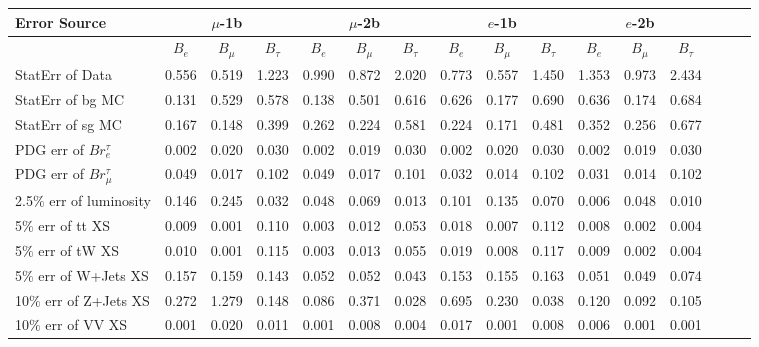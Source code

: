 \begin{sidewaystable}[p]
  \small
  \renewcommand{\arraystretch}{1.2}
  \centering

  \begin{tabular}{|l|ccc|ccc|ccc|ccc|ccc|}
  \hline
  Error Source & \multicolumn{3}{c|}{$\mu$-1b} & \multicolumn{3}{c|}{$\mu$-2b} & \multicolumn{3}{c|}{$e$-1b} & \multicolumn{3}{c|}{$e$-2b} \\
  \hline
                & $B_e$ & $B_\mu$ & $B_\tau$ & $B_e$ & $B_\mu$ & $B_\tau$ & $B_e$ & $B_\mu$ & $B_\tau$ & $B_e$ & $B_\mu$ & $B_\tau$ \\
  \hline
  StatErr of Data                            & 0.556 & 0.519 & 1.223 & 0.990 & 0.872 & 2.020 & 0.773 & 0.557 & 1.450 & 1.353 & 0.973 & 2.434 \\ 
  StatErr of bg MC                           & 0.131 & 0.529 & 0.578 & 0.138 & 0.501 & 0.616 & 0.626 & 0.177 & 0.690 & 0.636 & 0.174 & 0.684 \\ 
  StatErr of sg MC                           & 0.167 & 0.148 & 0.399 & 0.262 & 0.224 & 0.581 & 0.224 & 0.171 & 0.481 & 0.352 & 0.256 & 0.677 \\ 
  \hline
  PDG err of $Br^\tau_e$                     & 0.002 & 0.020 & 0.030 & 0.002 & 0.019 & 0.030 & 0.002 & 0.020 & 0.030 & 0.002 & 0.019 & 0.030 \\ 
  PDG err of $Br^\tau_\mu$                   & 0.049 & 0.017 & 0.102 & 0.049 & 0.017 & 0.101 & 0.032 & 0.014 & 0.102 & 0.031 & 0.014 & 0.102 \\ 
  2.5$\%$ err of luminosity                  & 0.146 & 0.245 & 0.032 & 0.048 & 0.069 & 0.013 & 0.101 & 0.135 & 0.070 & 0.006 & 0.048 & 0.010 \\ 
  5$\%$ err of tt XS                         & 0.009 & 0.001 & 0.110 & 0.003 & 0.012 & 0.053 & 0.018 & 0.007 & 0.112 & 0.008 & 0.002 & 0.004 \\ 
  5$\%$ err of tW XS                         & 0.010 & 0.001 & 0.115 & 0.003 & 0.013 & 0.055 & 0.019 & 0.008 & 0.117 & 0.009 & 0.002 & 0.004 \\ 
  5$\%$ err of W+Jets XS                     & 0.157 & 0.159 & 0.143 & 0.052 & 0.052 & 0.043 & 0.153 & 0.155 & 0.163 & 0.051 & 0.049 & 0.074 \\ 
  10$\%$ err of Z+Jets XS                    & 0.272 & 1.279 & 0.148 & 0.086 & 0.371 & 0.028 & 0.695 & 0.230 & 0.038 & 0.120 & 0.092 & 0.105 \\ 
  10$\%$ err of VV XS                        & 0.001 & 0.020 & 0.011 & 0.001 & 0.008 & 0.004 & 0.017 & 0.001 & 0.008 & 0.006 & 0.001 & 0.001 \\ 

\end{tabular}
\end{sidewaystable}

